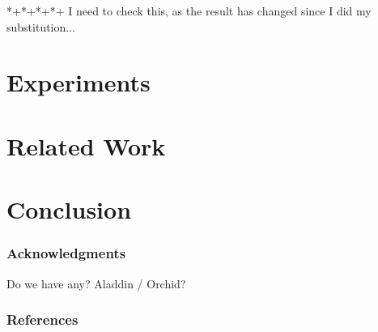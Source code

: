 \documentclass{article}
\begin{document}
*+*+*+*+ I need to check this, as the result has changed since I did my substitution...





\section{Experiments}




\section{Related Work}




\section{Conclusion}



\subsubsection*{Acknowledgments}
Do we have any? Aladdin / Orchid?


\subsubsection*{References}
\renewcommand{\refname}{\vskip -0.75cm}  %

\small{

}
\end{document}
